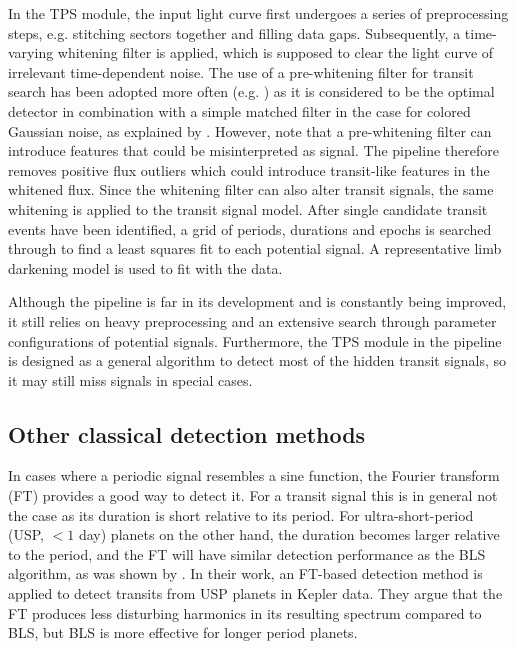 In the TPS module, the input light curve first undergoes a series of preprocessing steps, e.g. stitching sectors together and filling data gaps. Subsequently, a time-varying whitening filter is applied, which is supposed to clear the light curve of irrelevant time-dependent noise. The use of a pre-whitening filter for transit search has been adopted more often (e.g. \cite{carpano2003detecting}) as it is considered to be the optimal detector in combination with a simple matched filter in the case for colored Gaussian noise, as explained by \cite{jenkins2002impact}. However, \cite{rodenbeck2018revisiting} note that a pre-whitening filter can introduce features that could be misinterpreted as signal. The pipeline therefore removes positive flux outliers which could introduce transit-like features in the whitened flux. Since the whitening filter can also alter transit signals, the same whitening is applied to the transit signal model. After single candidate transit events have been identified, a grid of periods, durations and epochs is searched through to find a least squares fit to each potential signal. A representative limb darkening model is used to fit with the data.

Although the pipeline is far in its development and is constantly being improved, it still relies on heavy preprocessing and an extensive search through parameter configurations of potential signals. Furthermore, the TPS module in the pipeline is designed as a general algorithm to detect most of the hidden transit signals, so it may still miss signals in special cases.

\subsection{Other classical detection methods}

In cases where a periodic signal resembles a sine function, the Fourier transform (FT) provides a good way to detect it. For a transit signal this is in general not the case as its duration is short relative to its period. For ultra-short-period (USP, $< 1$ day) planets on the other hand, the duration becomes larger relative to the period, and the FT will have similar detection performance as the BLS algorithm, as was shown by \cite{sanchis2014study}. In their work, an FT-based detection method is applied to detect transits from USP planets in Kepler data. They argue that the FT produces less disturbing harmonics in its resulting spectrum compared to BLS, but BLS is more effective for longer period planets. 

